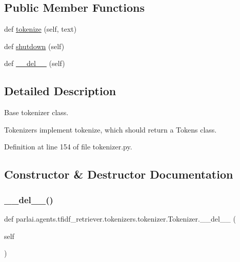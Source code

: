 \subsection*{Public Member Functions}
\begin{DoxyCompactItemize}
\item 
def \hyperlink{classparlai_1_1agents_1_1tfidf__retriever_1_1tokenizers_1_1tokenizer_1_1Tokenizer_a548699f403463496523213f3cf80c6c6}{tokenize} (self, text)
\item 
def \hyperlink{classparlai_1_1agents_1_1tfidf__retriever_1_1tokenizers_1_1tokenizer_1_1Tokenizer_a9c4af22e2a89737e6464bf031d16e32c}{shutdown} (self)
\item 
def \hyperlink{classparlai_1_1agents_1_1tfidf__retriever_1_1tokenizers_1_1tokenizer_1_1Tokenizer_aa2153a444d794bde7283f8bad237a8e6}{\+\_\+\+\_\+del\+\_\+\+\_\+} (self)
\end{DoxyCompactItemize}


\subsection{Detailed Description}
\begin{DoxyVerb}Base tokenizer class.

Tokenizers implement tokenize, which should return a Tokens class.
\end{DoxyVerb}
 

Definition at line 154 of file tokenizer.\+py.



\subsection{Constructor \& Destructor Documentation}
\mbox{\label{classparlai_1_1agents_1_1tfidf__retriever_1_1tokenizers_1_1tokenizer_1_1Tokenizer_aa2153a444d794bde7283f8bad237a8e6}} 
\subsubsection{\texorpdfstring{\+\_\+\+\_\+del\+\_\+\+\_\+()}{\_\_del\_\_()}}
{\footnotesize\ttfamily def parlai.\+agents.\+tfidf\+\_\+retriever.\+tokenizers.\+tokenizer.\+Tokenizer.\+\_\+\+\_\+del\+\_\+\+\_\+ (\begin{DoxyParamCaption}\item[{}]{self }\end{DoxyParamCaption})}



